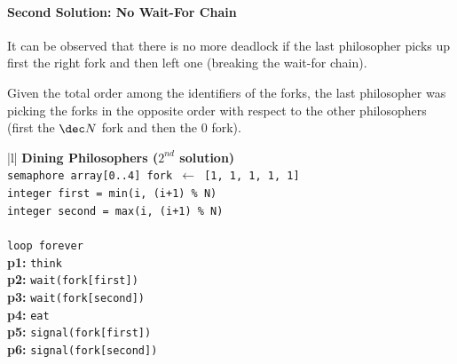 \begin{note}
\end{note}
%
\paragraph{Second Solution: No Wait-For Chain}\label{par:dp_second_solution_no_wait_for_chain} %
It can be observed that there is no more deadlock if the last philosopher picks up first the right fork and then left one (breaking the wait-for chain).
\begin{remark}{}{}
    Given the total order among the identifiers of the forks, the last philosopher was picking the forks in the opposite order with respect to the other philosophers (first the $\dec N$ fork and then the $0$ fork).
\end{remark}
\begin{ctable}{|l|}
    \hline
    \textbf{Dining Philosophers ($2^{nd}$ solution)} \\
    \hline
    \texttt{semaphore array[0..4] fork $\leftarrow$ [1, 1, 1, 1, 1]} \\
    \hline
    \texttt{integer first = min(i, (i+1) \% N)} \\
    \texttt{integer second = max(i, (i+1) \% N)} \\
    \\
    \texttt{loop forever} \\
    \textbf{p1:} \texttt{think} \\
    \textbf{p2:} \texttt{wait(fork[first])} \\
    \textbf{p3:} \texttt{wait(fork[second])} \\
    \textbf{p4:} \texttt{eat} \\
    \textbf{p5:} \texttt{signal(fork[first])} \\
    \textbf{p6:} \texttt{signal(fork[second])} \\
    \hline
\end{ctable}
%
